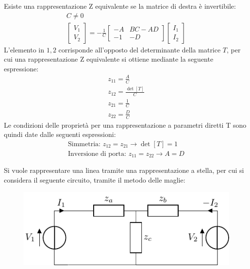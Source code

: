 \documentclass{article}
\numberwithin{equation}{subsection}
\begin{document}
Esiste una rappresentazione Z equivalente se la matrice di destra è invertibile:
\begin{gather*}
    C\neq0\\
    \displaystyle\begin{bmatrix}
        V_1\\V_2
    \end{bmatrix}=-\frac{1}{C}\begin{bmatrix}
        -A&BC-AD\\-1&-D
    \end{bmatrix}\begin{bmatrix}
        I_1\\I_2
    \end{bmatrix}
\end{gather*}
L'elemento in $1,2$ corrisponde all'opposto del determinante della matrice $T$, per cui una rappresentazione Z equivalente si ottiene mediante la seguente espressione:
\begin{gather*}
    z_{11}=\displaystyle\frac{A}{C}\\
    z_{12}=\displaystyle\frac{\det[T]}{C}\\
    z_{21}=\displaystyle\frac{1}{C}\\
    z_{22}=\displaystyle\frac{D}{C}
\end{gather*}
Le condizioni delle proprietà per una rappresentazione a parametri diretti T sono quindi date dalle seguenti espressioni:
\begin{gather}\label{eq:condizioni-parametri-diretti}
    \mbox{Simmetria: }z_{12}=z_{21}\to \det[T]=1\\
    \mbox{Inversione di porta: }z_{11}=z_{22}\to A=D
\end{gather}


Si vuole rappresentare una linea tramite una rappresentazione a stella, per cui si considera il seguente circuito, tramite il metodo delle maglie:
\begin{figure}[ht]%
    \centering
    \includegraphics{rappresentazione-stella-entrate-trasmissione-diretta.pdf}
    \label{fig:rappresentazone-stella-parametri-diretti}
\end{figure}
\end{document}
